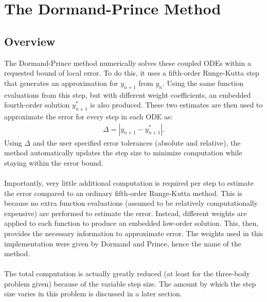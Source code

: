 \documentclass[12pt]{article}
\begin{document}
\section{The Dormand-Prince Method}
\subsection{Overview}
The Dormand-Prince method numerically solves these coupled ODEs within a requested bound of local error. To do this, it uses a fifth-order Runge-Kutta step that generates an approximation for $y_{n+1}$ from $y_n$. Using the same function evaluations from this step, but with different weight coefficients, an embedded fourth-order solution $y_{n+1}^*$ is also produced. These two estimates are then used to approximate the error for every step in each ODE as:
\begin{align*}
\Delta = |y_{n+1} - y_{n+1}^*|.
\end{align*}
Using $\Delta$ and the user specified error tolerances (absolute and relative), the method automatically updates the step size to minimize computation while staying within the error bound. \\ \\
Importantly, very little additional computation is required per step to estimate the error compared to an ordinary fifth-order Runge-Kutta method. This is because no extra function evaluations (assumed to be relatively computationally expensive) are performed to estimate the error. Instead, different weights are applied to each function to produce an embedded low-order solution. This, then, provides the necessary information to approximate error. The weights used in this implementation were given by Dormand and Prince, hence the name of the method. \\ \\
The total computation is actually greatly reduced (at least for the three-body problem given) because of the variable step size. The amount by which the step size varies in this problem is discussed in a later section.
\end{document}
